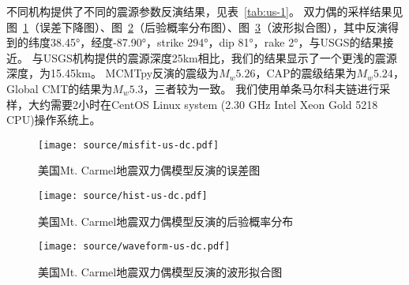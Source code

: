 不同机构提供了不同的震源参数反演结果，见表~\ref{tab:us-1}。
双力偶的采样结果见图~\ref{fig:misfit-us-dc}（误差下降图）、图~\ref{fig:hist-us-dc}（后验概率分布图）、图~\ref{fig:waveform-us-dc}（波形拟合图），其中反演得到的纬度38.45°，经度-87.90°，strike 294°，dip 81°，rake 2°，与USGS的结果接近。
与USGS机构提供的震源深度25km相比，我们的结果显示了一个更浅的震源深度，为15.45km。
MCMTpy反演的震级为$M_w 5.26$，CAP的震级结果为$M_w 5.24$\citep{He2018}，Global CMT的结果为$M_w 5.3$，三者较为一致。
我们使用单条马尔科夫链进行采样，大约需要2小时在CentOS Linux system (2.30 GHz Intel Xeon Gold 5218 CPU)操作系统上。

\begin{figure}[h]
    \centering
    \texttt{[image: source/misfit-us-dc.pdf]}
    \caption{美国Mt. Carmel地震双力偶模型反演的误差图}
    \label{fig:misfit-us-dc}
\end{figure}

\begin{figure}[h]
    \centering
    \texttt{[image: source/hist-us-dc.pdf]}
    \caption{美国Mt. Carmel地震双力偶模型反演的后验概率分布}
    \label{fig:hist-us-dc}
\end{figure}


\begin{figure}[h]
    \centering
    \texttt{[image: source/waveform-us-dc.pdf]}
    \caption{美国Mt. Carmel地震双力偶模型反演的波形拟合图}
    \label{fig:waveform-us-dc}
\end{figure}



